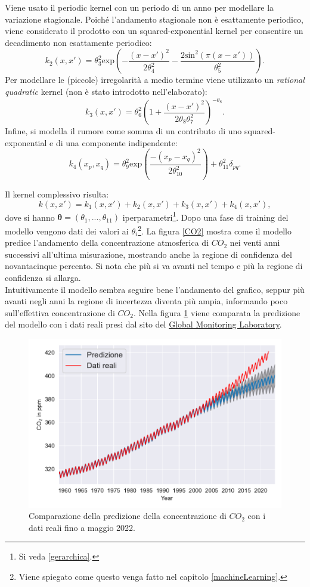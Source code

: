 Viene usato il periodic kernel con un periodo di un anno per modellare la variazione stagionale. Poiché l'andamento stagionale non è esattamente periodico, viene considerato il prodotto con un squared-exponential kernel per consentire un decadimento non esattamente periodico: 
\[
k_2(x, x') = \theta^2_3 \text{exp}\left( - \frac{(x - x')^2}{2\theta^2_4} - \frac{2 \text{sin}^2(\pi(x - x'))}{\theta^2_5} \right).
\]
Per modellare le (piccole) irregolarità a medio termine viene utilizzato un \textit{rational quadratic} kernel (non è stato introdotto nell'elaborato): 
\[
k_3(x, x') = \theta^2_6 \left( 1 + \frac{(x - x')^2}{2\theta_8\theta^2_7} \right)^{-\theta_8}.
\] 
Infine, si modella il rumore come somma di un contributo di uno squared-exponential e di una componente indipendente:
\[
k_4(x_p, x_q) = \theta^2_9 \text{exp}\left( \frac{- (x_p - x_q)^2}{2\theta^2_{10}} \right) + \theta^2_{11} \delta_{pq}.
\]

Il kernel complessivo risulta:
\[
k(x,x')=k_1(x,x')+k_2(x,x')+k_3(x,x')+k_4(x,x'),
\]
dove si hanno $\bm{\theta}=(\theta_1,...,\theta_{11})$ iperparametri\footnote{Si veda \ref{gerarchica}.}. Dopo una fase di training del modello vengono dati dei valori ai $\theta_i$\footnote{Viene spiegato come questo venga fatto nel capitolo \ref{machineLearning}.}. La figura \ref{CO2} mostra come il modello predice l'andamento della concentrazione atmosferica di $CO_2$ nei venti anni successivi all'ultima misurazione, mostrando anche la regione di confidenza del novantacinque percento. Si nota che più si va avanti nel tempo e più la regione di confidenza si allarga.\\
Intuitivamente il modello sembra seguire bene l'andamento del grafico, seppur più avanti negli anni la regione di incertezza diventa più ampia, informando poco sull'effettiva concentrazione di $CO_2$. Nella figura \ref{CO2_comparison} viene comparata la predizione del modello con i dati reali presi dal sito del \href{https://gml.noaa.gov/ccgg/trends/}{Global Monitoring Laboratory}.


\begin{figure}[h]
    \centering
    \includegraphics[width=1\textwidth]{images/Gaussian process/MaunaLoaPrediction.pdf}
    \caption{Comparazione della predizione della concentrazione di $CO_2$ con i dati reali fino a maggio 2022.}
    \label{CO2_comparison}
\end{figure}

